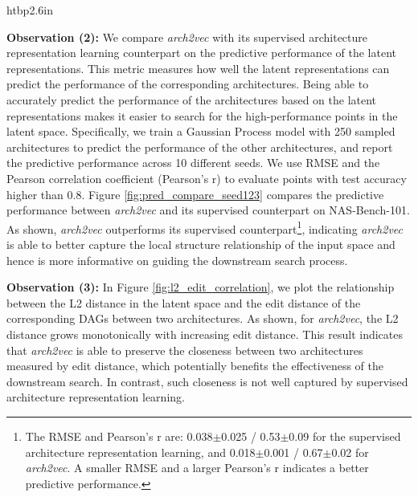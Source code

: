 \begin{wrapfigure}{htbp}{2.6in}
\begin{minipage}{2.6in}
\vspace{-7mm}
\vspace{-6mm}
\caption{{\footnotesize Predictive performance comparison between \textit{arch2vec} (left) and supervised architecture representation learning (right) on NAS-Bench-101.}}
\vspace{-3mm}
\label{fig:pred_compare_seed123}
\end{minipage}
\end{wrapfigure}
\textbf{Observation (2):} 
We compare \textit{arch2vec} with its supervised architecture representation learning counterpart on the predictive performance of the latent representations. This metric measures how well the latent representations can predict the performance of the corresponding architectures.
Being able to accurately predict the performance of the architectures based on the latent representations makes it easier to search for the high-performance points in the latent space. 
Specifically, we train a Gaussian Process model with 250 sampled architectures to predict the performance of the other architectures, and report the predictive performance across 10 different seeds. We use RMSE and the Pearson correlation coefficient (Pearson's r) to evaluate points with test accuracy higher than 0.8. 
Figure \ref{fig:pred_compare_seed123} compares the predictive performance between \textit{arch2vec} and its supervised counterpart on NAS-Bench-101. 
As shown, \textit{arch2vec} outperforms its supervised counterpart\footnote{The RMSE and Pearson's r are: 0.038$\pm$0.025 / 0.53$\pm$0.09 for the supervised architecture representation learning, and 0.018$\pm$0.001 / 0.67$\pm$0.02 for \textit{arch2vec}. A smaller RMSE and a larger Pearson’s r indicates a better predictive performance.}, indicating \textit{arch2vec} is able to better capture the local structure relationship of the input space and hence is more informative on guiding the downstream search process.












\textbf{Observation (3):} In Figure \ref{fig:l2_edit_correlation}, we plot the relationship between the L2 distance in the latent space and the edit distance of the corresponding DAGs between two architectures. As shown, for \textit{arch2vec}, the L2 distance grows monotonically with increasing edit distance. This result indicates that \textit{arch2vec} is able to preserve the closeness between two architectures measured by edit distance, which potentially benefits the effectiveness of the downstream search. In contrast, such closeness is not well captured by supervised architecture representation learning.







